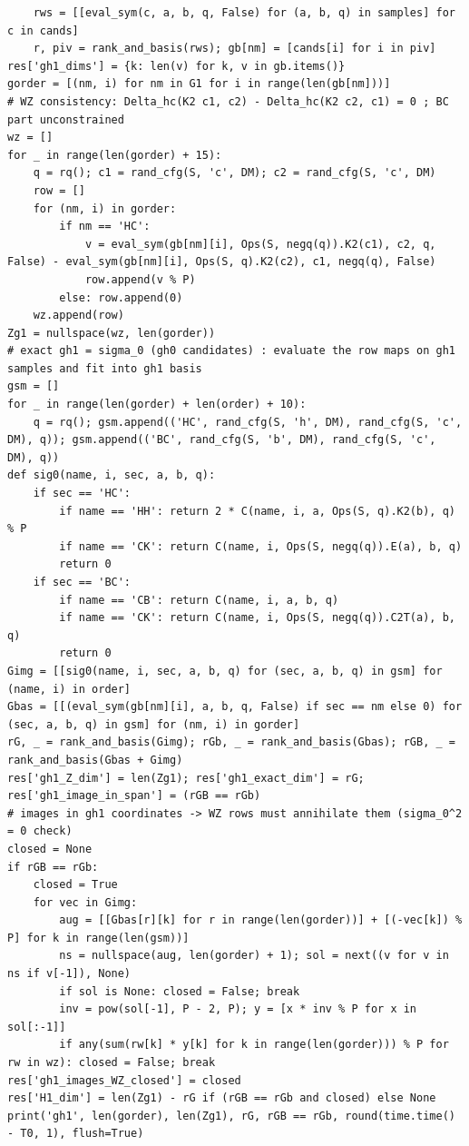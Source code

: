 \documentclass[10pt]{article}
\begin{document}
\begin{lstlisting}
    rws = [[eval_sym(c, a, b, q, False) for (a, b, q) in samples] for c in cands]
    r, piv = rank_and_basis(rws); gb[nm] = [cands[i] for i in piv]
res['gh1_dims'] = {k: len(v) for k, v in gb.items()}
gorder = [(nm, i) for nm in G1 for i in range(len(gb[nm]))]
# WZ consistency: Delta_hc(K2 c1, c2) - Delta_hc(K2 c2, c1) = 0 ; BC part unconstrained
wz = []
for _ in range(len(gorder) + 15):
    q = rq(); c1 = rand_cfg(S, 'c', DM); c2 = rand_cfg(S, 'c', DM)
    row = []
    for (nm, i) in gorder:
        if nm == 'HC':
            v = eval_sym(gb[nm][i], Ops(S, negq(q)).K2(c1), c2, q, False) - eval_sym(gb[nm][i], Ops(S, q).K2(c2), c1, negq(q), False)
            row.append(v % P)
        else: row.append(0)
    wz.append(row)
Zg1 = nullspace(wz, len(gorder))
# exact gh1 = sigma_0 (gh0 candidates) : evaluate the row maps on gh1 samples and fit into gh1 basis
gsm = []
for _ in range(len(gorder) + len(order) + 10):
    q = rq(); gsm.append(('HC', rand_cfg(S, 'h', DM), rand_cfg(S, 'c', DM), q)); gsm.append(('BC', rand_cfg(S, 'b', DM), rand_cfg(S, 'c', DM), q))
def sig0(name, i, sec, a, b, q):
    if sec == 'HC':
        if name == 'HH': return 2 * C(name, i, a, Ops(S, q).K2(b), q) % P
        if name == 'CK': return C(name, i, Ops(S, negq(q)).E(a), b, q)
        return 0
    if sec == 'BC':
        if name == 'CB': return C(name, i, a, b, q)
        if name == 'CK': return C(name, i, Ops(S, negq(q)).C2T(a), b, q)
        return 0
Gimg = [[sig0(name, i, sec, a, b, q) for (sec, a, b, q) in gsm] for (name, i) in order]
Gbas = [[(eval_sym(gb[nm][i], a, b, q, False) if sec == nm else 0) for (sec, a, b, q) in gsm] for (nm, i) in gorder]
rG, _ = rank_and_basis(Gimg); rGb, _ = rank_and_basis(Gbas); rGB, _ = rank_and_basis(Gbas + Gimg)
res['gh1_Z_dim'] = len(Zg1); res['gh1_exact_dim'] = rG; res['gh1_image_in_span'] = (rGB == rGb)
# images in gh1 coordinates -> WZ rows must annihilate them (sigma_0^2 = 0 check)
closed = None
if rGB == rGb:
    closed = True
    for vec in Gimg:
        aug = [[Gbas[r][k] for r in range(len(gorder))] + [(-vec[k]) % P] for k in range(len(gsm))]
        ns = nullspace(aug, len(gorder) + 1); sol = next((v for v in ns if v[-1]), None)
        if sol is None: closed = False; break
        inv = pow(sol[-1], P - 2, P); y = [x * inv % P for x in sol[:-1]]
        if any(sum(rw[k] * y[k] for k in range(len(gorder))) % P for rw in wz): closed = False; break
res['gh1_images_WZ_closed'] = closed
res['H1_dim'] = len(Zg1) - rG if (rGB == rGb and closed) else None
print('gh1', len(gorder), len(Zg1), rG, rGB == rGb, round(time.time() - T0, 1), flush=True)

\end{lstlisting}
\end{document}
